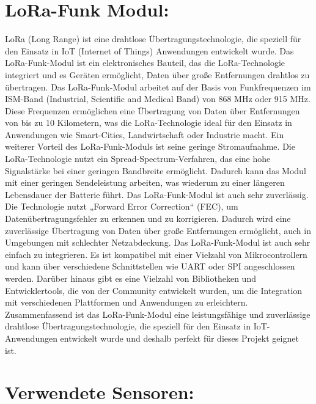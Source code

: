 \section{LoRa-Funk Modul:}
LoRa (Long Range) ist eine drahtlose Übertragungstechnologie, die speziell für den Einsatz in IoT (Internet of Things) Anwendungen entwickelt wurde. 
Das LoRa-Funk-Modul ist ein elektronisches Bauteil, das die LoRa-Technologie integriert und es Geräten ermöglicht, Daten über große Entfernungen drahtlos zu übertragen. 
Das LoRa-Funk-Modul arbeitet auf der Basis von Funkfrequenzen im ISM-Band (Industrial, Scientific and Medical Band) von 868 MHz oder 915 MHz. 
Diese Frequenzen ermöglichen eine Übertragung von Daten über Entfernungen von bis zu 10 Kilometern, was die LoRa-Technologie ideal für den Einsatz in Anwendungen wie Smart-Cities, Landwirtschaft oder Industrie macht. 
Ein weiterer Vorteil des LoRa-Funk-Moduls ist seine geringe Stromaufnahme. Die LoRa-Technologie nutzt ein Spread-Spectrum-Verfahren, das eine hohe Signalstärke bei einer geringen Bandbreite ermöglicht. 
Dadurch kann das Modul mit einer geringen Sendeleistung arbeiten, was wiederum zu einer längeren Lebensdauer der Batterie führt. 
Das LoRa-Funk-Modul ist auch sehr zuverlässig. 
Die Technologie nutzt „Forward Error Correction“ (FEC), um Datenübertragungsfehler zu erkennen und zu korrigieren. 
Dadurch wird eine zuverlässige Übertragung von Daten über große Entfernungen ermöglicht, auch in Umgebungen mit schlechter Netzabdeckung. 
Das LoRa-Funk-Modul ist auch sehr einfach zu integrieren. Es ist kompatibel mit einer Vielzahl von Mikrocontrollern und kann über verschiedene Schnittstellen wie UART oder SPI angeschlossen werden. 
Darüber hinaus gibt es eine Vielzahl von Bibliotheken und Entwicklertools, die von der Community entwickelt wurden, um die Integration mit verschiedenen Plattformen und Anwendungen zu erleichtern. 
Zusammenfassend ist das LoRa-Funk-Modul eine leistungsfähige und zuverlässige drahtlose Übertragungstechnologie, die speziell für den Einsatz in IoT-Anwendungen entwickelt wurde und deshalb perfekt für dieses Projekt geignet ist.


\newpage
\section{Verwendete Sensoren:}
